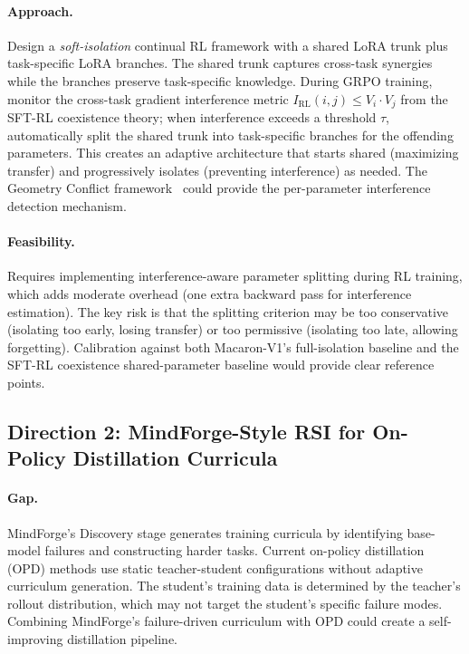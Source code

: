 \documentclass[11pt,a4paper]{article}
\begin{document}
\paragraph{Approach.} Design a \emph{soft-isolation} continual RL framework with a shared LoRA trunk plus task-specific LoRA branches. The shared trunk captures cross-task synergies while the branches preserve task-specific knowledge. During GRPO training, monitor the cross-task gradient interference metric $I_{\text{RL}}(i,j) \leq V_i \cdot V_j$ from the SFT-RL coexistence theory; when interference exceeds a threshold $\tau$, automatically split the shared trunk into task-specific branches for the offending parameters. This creates an adaptive architecture that starts shared (maximizing transfer) and progressively isolates (preventing interference) as needed. The Geometry Conflict framework~\cite{geoconflict2026} could provide the per-parameter interference detection mechanism.

\paragraph{Feasibility.} Requires implementing interference-aware parameter splitting during RL training, which adds moderate overhead (one extra backward pass for interference estimation). The key risk is that the splitting criterion may be too conservative (isolating too early, losing transfer) or too permissive (isolating too late, allowing forgetting). Calibration against both Macaron-V1's full-isolation baseline and the SFT-RL coexistence shared-parameter baseline would provide clear reference points.

\subsection{Direction 2: MindForge-Style RSI for On-Policy Distillation Curricula}

\paragraph{Gap.} MindForge's Discovery stage generates training curricula by identifying base-model failures and constructing harder tasks. Current on-policy distillation (OPD) methods use static teacher-student configurations without adaptive curriculum generation. The student's training data is determined by the teacher's rollout distribution, which may not target the student's specific failure modes. Combining MindForge's failure-driven curriculum with OPD could create a self-improving distillation pipeline.
\end{document}
